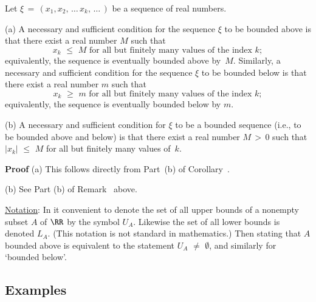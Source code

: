 \V

        Let ${\xi} \,=\, (x_{1}, x_{2},\,{\ldots}\,x_{k},\,{\ldots}\,)$ be a sequence of real numbers.

\V

        (a) A necessary and sufficient condition for the sequence ${\xi}$ to be bounded above is that there exist a real number $M$ such that
        \begin{displaymath}
        x_{k}\,\,{\leq}\,\,M \mbox{ for all but finitely many values of the index~$k$};
        \end{displaymath}
    equivalently, the sequence is eventually bounded above by~$M$.
    Similarly, a necessary and sufficient condition for the sequence ${\xi}$ to be bounded below is that there exist a real number $m$ such that
        \begin{displaymath}
        x_{k}\,\,{\geq}\,\,m \mbox{ for all but finitely many values of the index~$k$};
        \end{displaymath}
    equivalently, the sequence is eventually bounded below by $m$.

\V

        (b) A necessary and sufficient condition for ${\xi}$ to be a bounded sequence (i.e., to be bounded above and below)
    is that there exist a real number $M\,>\,0$ such that $|x_{k}|\,\,{\leq}\,\,M$ for all but finitely many values of~$k$.

\V

        {\bf Proof} (a) This follows directly from Part~(b) of Corollary~.

        \V

        (b) See Part (b) of Remark~ above.

\VV


        \underline{Notation}: In {\TheseNotes} it convenient to denote the set of all upper bounds of a nonempty subset $A$ of ${\RR}$ by the symbol $U_{A}$.
    Likewise the set of all lower bounds is denoted $L_{A}$.
    (This notation is not standard in mathematics.)
    Then stating that $A$ bounded above is equivalent to the statement $U_{A} \,\,{\neq}\,\, {\emptyset}$, and similarly for `bounded below'.

\V
\V

            \subsection{\small{\bf Examples}}
            \label{ExampB30.20}

